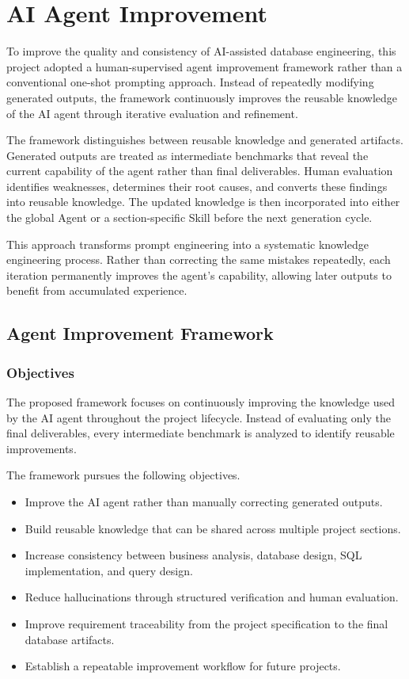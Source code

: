 \section{AI Agent Improvement}

To improve the quality and consistency of AI-assisted database engineering, this project adopted a human-supervised agent improvement framework rather than a conventional one-shot prompting approach. Instead of repeatedly modifying generated outputs, the framework continuously improves the reusable knowledge of the AI agent through iterative evaluation and refinement.

The framework distinguishes between reusable knowledge and generated artifacts. Generated outputs are treated as intermediate benchmarks that reveal the current capability of the agent rather than final deliverables. Human evaluation identifies weaknesses, determines their root causes, and converts these findings into reusable knowledge. The updated knowledge is then incorporated into either the global Agent or a section-specific Skill before the next generation cycle.

This approach transforms prompt engineering into a systematic knowledge engineering process. Rather than correcting the same mistakes repeatedly, each iteration permanently improves the agent's capability, allowing later outputs to benefit from accumulated experience.

\subsection{Agent Improvement Framework}

\subsubsection{Objectives}

The proposed framework focuses on continuously improving the knowledge used by the AI agent throughout the project lifecycle. Instead of evaluating only the final deliverables, every intermediate benchmark is analyzed to identify reusable improvements.

The framework pursues the following objectives.

\begin{itemize}[leftmargin=2em]
	\item Improve the AI agent rather than manually correcting generated outputs.
	\item Build reusable knowledge that can be shared across multiple project sections.
	\item Increase consistency between business analysis, database design, SQL implementation, and query design.
	\item Reduce hallucinations through structured verification and human evaluation.
	\item Improve requirement traceability from the project specification to the final database artifacts.
	\item Establish a repeatable improvement workflow for future projects.
\end{itemize}

